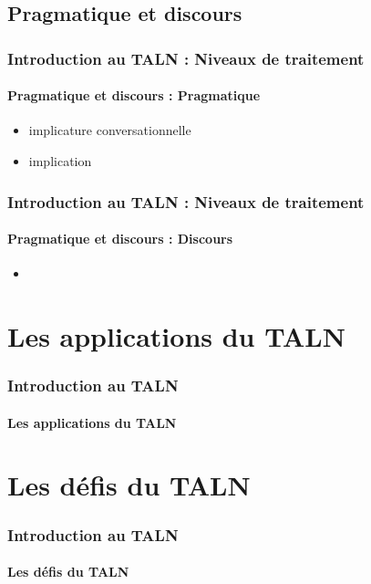 \documentclass[xcolor=table]{beamer}
\begin{document}
\subsection{Pragmatique et discours}

\begin{frame}
\frametitle{Introduction au TALN : Niveaux de traitement}
\framesubtitle{Pragmatique et discours : Pragmatique}

\begin{itemize}
	\item implicature conversationnelle
	\item implication
\end{itemize}

\end{frame}

\begin{frame}
\frametitle{Introduction au TALN : Niveaux de traitement}
\framesubtitle{Pragmatique et discours : Discours}

\begin{itemize}
	\item 
\end{itemize}

\end{frame}

\section{Les applications du TALN}

\begin{frame}
\frametitle{Introduction au TALN}
\framesubtitle{Les applications du TALN}

\end{frame}

\section{Les défis du TALN}

\begin{frame}
\frametitle{Introduction au TALN}
\framesubtitle{Les défis du TALN}

\end{frame}



\end{document}
